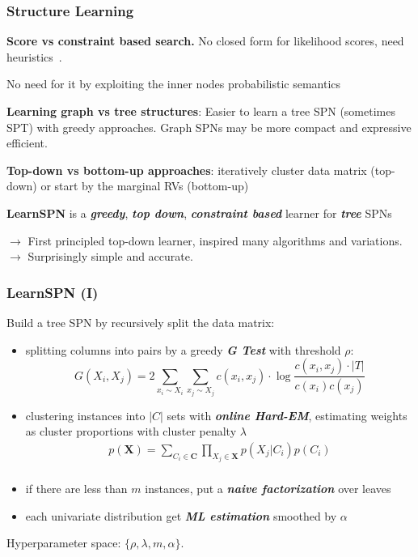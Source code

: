 \documentclass[10pt, t, xcolor={usenames,dvipsnames,svgnames}, compress]{beamer}
\begin{document}
\begin{frame}
  \frametitle{Structure Learning}

  \textbf{Score vs constraint based search.}
  No closed form for likelihood scores, need
  heuristics~\parencite{Rooshenas2014}.\par
  No need for it by exploiting the inner nodes probabilistic semantics\par\bigskip
  
  \textbf{Learning graph vs tree structures}:
  Easier to learn a tree SPN (sometimes SPT) with greedy
  approaches. Graph SPNs may be more compact and expressive efficient.\par\bigskip

  \textbf{Top-down vs bottom-up approaches}: iteratively cluster data
  matrix (top-down) or start by the marginal RVs (bottom-up)\par\bigskip

  \textbf{LearnSPN} is a \emph{\textbf{greedy}}, \emph{\textbf{top down}}, \emph{\textbf{constraint
      based}} learner for \emph{\textbf{tree}} SPNs~\parencite{Gens2013}\par
  $\rightarrow$ First principled top-down learner, inspired many algorithms and
  variations.
  $\rightarrow$ Surprisingly simple and accurate.
\end{frame}



\begin{frame}[t]
  \frametitle{LearnSPN (I)}
  Build a tree SPN by recursively split the data matrix:

  \begin{itemize}
  \item splitting columns into pairs by a greedy \textbf{\emph{G Test}} with threshold $\rho$:
    \[
      G(X_i, X_j) =  2\sum_{x_i \sim X_i}\sum_{x_j \sim X_j}c(x_i, x_j)\cdot \log\frac{c(x_i, x_j)\cdot |T|}{c(x_i)c(x_j)}
    \]
  \item clustering instances into $|C|$ sets with \textbf{\emph{online
        Hard-EM}},  estimating weights as cluster proportions with cluster penalty
    $\lambda$
    \[\begin{array}{cc}
        p(\mathbf{X})= \sum_{C_i \in \mathbf{C}}\prod_{X_j \in \mathbf{X}}p(X_j|C_i)p(C_i)\\
      \end{array}\]
  \item if there are less than $m$ instances, put a \textbf{\emph{naive
        factorization}} over leaves
  \item each univariate distribution get \emph{\textbf{ML estimation}} smoothed by $\alpha$  
  \end{itemize}\par\bigskip

  Hyperparameter space: $\{\rho, \lambda, m, \alpha\}$.
\end{frame}
\end{document}

